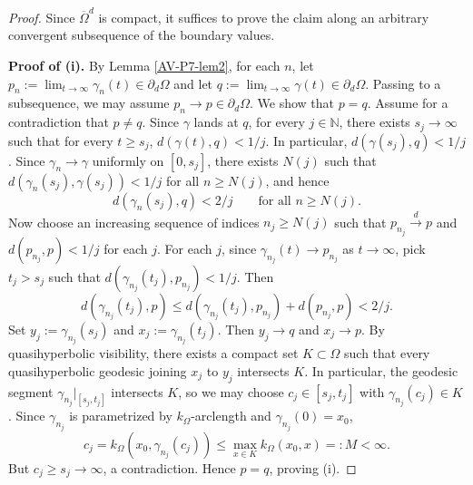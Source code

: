 \documentclass[10pt,a4paper]{amsart}
\begin{document}
\begin{proof}
Since $\overline{\Omega}^d$ is compact, it suffices to prove the claim along an arbitrary convergent subsequence of the boundary values.
	
	\noindent\textbf{Proof of (i).}
By Lemma \ref{AV-P7-lem2}, for each $n$, let $p_n:=\lim_{t\to\infty}\gamma_n(t)\in\partial_d\Omega$ and let $q:=\lim_{t\to\infty}\gamma(t)\in\partial_d\Omega$. Passing to a subsequence, we may assume $p_n\to p\in\partial_d\Omega$. We show that $p=q$. Assume for a contradiction that $p\neq q$. Since $\gamma$ lands at $q$, for every $j\in \mathbb{N}$, there exists $s_j\to \infty$ such that for every $t\ge s_j$, $d(\gamma(t),q)<1/j$. In particular, $d(\gamma(s_j),q)<1/j$. Since $\gamma_n\to\gamma$ uniformly on $[0,s_j]$, there exists $N(j)$ such that
	$d(\gamma_n(s_j),\gamma(s_j))<1/j$ for all $n\ge N(j)$, and hence
	\[
	d(\gamma_n(s_j),q)<2/j\qquad\text{for all }n\ge N(j).
	\]
Now choose an increasing sequence of indices $n_j\ge N(j)$ such that $p_{n_j}\stackrel{d}{\to} p$
and $d(p_{n_j},p)<1/j$ for each $j$. For each $j$, since $\gamma_{n_j}(t)\to p_{n_j}$ as $t\to\infty$, pick $t_j>s_j$ such that
$d(\gamma_{n_j}(t_j),p_{n_j})<1/j$. Then
\[
d(\gamma_{n_j}(t_j),p)\le d(\gamma_{n_j}(t_j),p_{n_j})+d(p_{n_j},p)<2/j.
\]
Set $y_j:=\gamma_{n_j}(s_j)$ and $x_j:=\gamma_{n_j}(t_j)$. Then $y_j\to q$ and $x_j\to p$. By quasihyperbolic visibility, there exists a compact set
$K\subset\Omega$ such that every quasihyperbolic geodesic joining $x_j$ to $y_j$ intersects $K$.
In particular, the geodesic segment $\gamma_{n_j}|_{[s_j,t_j]}$ intersects $K$, so we may choose
$c_j\in[s_j,t_j]$ with $\gamma_{n_j}(c_j)\in K$.
Since $\gamma_{n_j}$ is parametrized by $k_\Omega$-arclength and $\gamma_{n_j}(0)=x_0$,
\[
c_j=k_\Omega(x_0,\gamma_{n_j}(c_j))\le \max_{x\in K}k_\Omega(x_0,x)=:M<\infty.
\]
But $c_j\ge s_j\to\infty$, a contradiction. Hence $p=q$, proving (i).
 

\end{proof}
\end{document}

